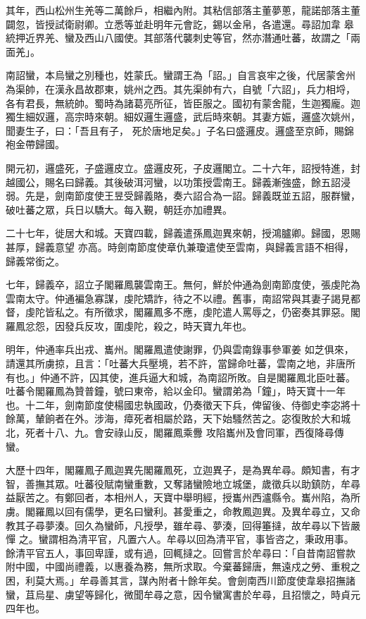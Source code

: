 \begin{pinyinscope}
 其年，西山松州生羌等二萬餘戶，相繼內附。其粘信部落主董夢蔥，龍諾部落主董闢忽，皆授試衛尉卿。立悉等並赴明年元會訖，錫以金帛，各遣還。尋詔加韋
 皋統押近界羌、蠻及西山八國使。其部落代襲刺史等官，然亦潛通吐蕃，故謂之「兩面羌」。



 南詔蠻，本烏蠻之別種也，姓蒙氏。蠻謂王為「詔。」自言哀牢之後，代居蒙舍州為渠帥，在漢永昌故郡東，姚州之西。其先渠帥有六，自號「六詔」，兵力相埒，各有君長，無統帥。蜀時為諸葛亮所征，皆臣服之。國初有蒙舍龍，生迦獨龐。迦獨生細奴邏，高宗時來朝。細奴邏生邏盛，武后時來朝。其妻方娠，邏盛次姚州，聞妻生子，曰：「吾且有子，
 死於唐地足矣。」子名曰盛邏皮。邏盛至京師，賜錦袍金帶歸國。



 開元初，邏盛死，子盛邏皮立。盛邏皮死，子皮邏閣立。二十六年，詔授特進，封越國公，賜名曰歸義。其後破洱河蠻，以功策授雲南王。歸義漸強盛，餘五詔浸弱。先是，劍南節度使王昱受歸義賂，奏六詔合為一詔。歸義既並五詔，服群蠻，破吐蕃之眾，兵日以驕大。每入覲，朝廷亦加禮異。



 二十七年，徙居大和城。天寶四載，歸義遣孫鳳迦異來朝，授鴻臚卿。歸國，恩賜甚厚，歸義意望
 亦高。時劍南節度使章仇兼瓊遣使至雲南，與歸義言語不相得，歸義常銜之。



 七年，歸義卒，詔立子閣羅鳳襲雲南王。無何，鮮於仲通為劍南節度使，張虔陀為雲南太守。仲通褊急寡謀，虔陀矯詐，待之不以禮。舊事，南詔常與其妻子謁見都督，虔陀皆私之。有所徵求，閣羅鳳多不應，虔陀遣人罵辱之，仍密奏其罪惡。閣羅鳳忿怨，因發兵反攻，圍虔陀，殺之，時天寶九年也。



 明年，仲通率兵出戎、巂州。閣羅鳳遣使謝罪，仍與雲南錄事參軍姜
 如芝俱來，請還其所虜掠，且言：「吐蕃大兵壓境，若不許，當歸命吐蕃，雲南之地，非唐所有也。」仲通不許，囚其使，進兵逼大和城，為南詔所敗。自是閣羅鳳北臣吐蕃。吐蕃令閣羅鳳為贊普鐘，號曰東帝，給以金印。蠻謂弟為「鐘」，時天寶十一年也。十二年，劍南節度使楊國忠執國政，仍奏徵天下兵，俾留後、侍御史李宓將十餘萬，輦餉者在外。涉海，瘴死者相屬於路，天下始騷然苦之。宓復敗於大和城北，死者十八、九。會安祿山反，閣羅鳳乘釁
 攻陷巂州及會同軍，西復降尋傳蠻。



 大歷十四年，閣羅鳳子鳳迦異先閣羅鳳死，立迦異子，是為異牟尋。頗知書，有才智，善撫其眾。吐蕃役賦南蠻重數，又奪諸蠻險地立城堡，歲徵兵以助鎮防，牟尋益厭苦之。有鄭回者，本相州人，天寶中舉明經，授巂州西瀘縣令。巂州陷，為所虜。閣羅鳳以回有儒學，更名曰蠻利。甚愛重之，命教鳳迦異。及異牟尋立，又命教其子尋夢湊。回久為蠻師，凡授學，雖牟尋、夢湊，回得箠撻，故牟尋以下皆嚴憚
 之。蠻謂相為清平官，凡置六人。牟尋以回為清平官，事皆咨之，秉政用事。餘清平官五人，事回卑謹，或有過，回輒撻之。回嘗言於牟尋曰：「自昔南詔嘗款附中國，中國尚禮義，以惠養為務，無所求取。今棄蕃歸唐，無遠戍之勞、重稅之困，利莫大焉。」牟尋善其言，謀內附者十餘年矣。會劍南西川節度使韋皋招撫諸蠻，苴烏星、虜望等歸化，微聞牟尋之意，因令蠻寓書於牟尋，且招懷之，時貞元四年也。




\end{pinyinscope}
